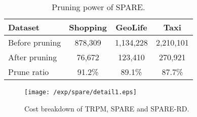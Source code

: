 \begin{table}[h]
\centering
\begin{tabular}{|l|c|c|c|}
\hline 
\textbf{Dataset} & \textbf{Shopping} & \textbf{GeoLife} & \textbf{Taxi} \\ 
\hline 
Before pruning & 878,309 &  1,134,228 & 2,210,101 \\ 
\hline 
After pruning & 76,672 & 123,410 & 270,921 \\ 
\hline 
Prune ratio & 91.2\% & 89.1\% & 87.7\% \\ 
\hline 
\end{tabular} 

\caption{Pruning power of SPARE.}
\label{tbl:pruning}
\end{table}

\vspace{-3mm}
\begin{figure}[h]
\centering
	  \texttt{[image: /exp/spare/detail1.eps]}
    \caption{Cost breakdown of TRPM, SPARE and SPARE-RD.}
    \label{exp:wl}
\end{figure}

